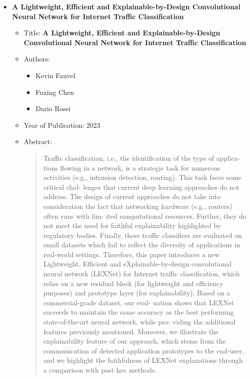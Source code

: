 \documentclass{article}
\begin{document}
\begin{itemize}
        \item \textbf{A Lightweight, Efficient and Explainable-by-Design
        Convolutional Neural Network for Internet Traffic Classification}
        \begin{itemize}
            \item Title: \textbf{A Lightweight, Efficient and Explainable-by-Design
            Convolutional Neural Network for Internet Traffic Classification}
            \item Authors:
            \begin{itemize}
                \item Kevin Fauvel
                \item Fuxing Chen
                \item Dario Rossi
            \end{itemize}
            \item Year of Publication: 2023
            \item Abstract:
            \begin{abstract}
                Traffic classification, i.e., the identification of the type of applica-
                tions flowing in a network, is a strategic task for numerous activities
                (e.g., intrusion detection, routing). This task faces some critical chal-
                lenges that current deep learning approaches do not address. The
                design of current approaches do not take into consideration the
                fact that networking hardware (e.g., routers) often runs with lim-
                ited computational resources. Further, they do not meet the need
                for faithful explainability highlighted by regulatory bodies. Finally,
                these traffic classifiers are evaluated on small datasets which fail to
                reflect the diversity of applications in real-world settings.
                Therefore, this paper introduces a new Lightweight, Efficient
                and eXplainable-by-design convolutional neural network (LEXNet)
                for Internet traffic classification, which relies on a new residual
                block (for lightweight and efficiency purposes) and prototype layer
                (for explainability). Based on a commercial-grade dataset, our eval-
                uation shows that LEXNet succeeds to maintain the same accuracy
                as the best performing state-of-the-art neural network, while pro-
                viding the additional features previously mentioned. Moreover, we
                illustrate the explainability feature of our approach, which stems
                from the communication of detected application prototypes to the
                end-user, and we highlight the faithfulness of LEXNet explanations
                through a comparison with post hoc methods.
            \end{abstract}
        \end{itemize}


\end{itemize}
\end{document}
